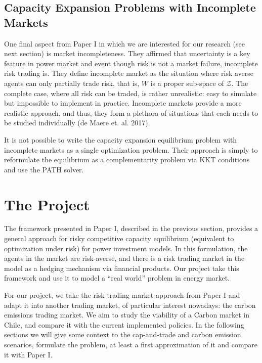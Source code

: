 \documentclass[11pt, letterpaper]{article}
\begin{document}
\subsection{Capacity Expansion Problems with Incomplete Markets}
One final aspect from Paper I in which we are interested for our research (see next section) is market incompleteness. They affirmed that uncertainty is a key feature in power market and event though risk is not a market failure, incomplete risk trading is. They define incomplete market as the situation where risk averse agents can only partially trade risk, that is, $W$ is a proper sub-space of $\mathcal{Z}$. The complete case, where all risk can be traded, is rather unrealistic: easy to simulate but impossible to implement in practice. Incomplete markets provide a more realistic approach, and thus, they form a plethora of situations that each needs to be studied individually (de Maere et. al. 2017). 

\smallskip

It is not possible to write the capacity expansion equilibrium problem with incomplete markets as a single optimization problem. Their approach is simply to reformulate the equilibrium as a complementarity problem via KKT conditions and use the PATH solver. 


\section{The Project} \label{future}

The framework presented in Paper I, described in the previous section, provides a general approach for risky competitive capacity equilibrium (equivalent to optimization under risk) for power investment models. In this formulation, the agents in the market are risk-averse, and there is a risk trading market in the model as a hedging mechanism via financial products.  Our project take this framework and use it to model a ``real world'' problem in energy market. 
\smallskip

For our project, we take the risk trading market approach from Paper I and adapt it into another trading market, of particular interest nowadays: the carbon emissions trading market. We aim to study the viability of a Carbon market in Chile, and compare it with the current implemented policies. 
In the following sections we will give some context to the cap-and-trade and carbon emission scenarios, formulate the problem, at least a first approximation of it and compare it with Paper I.
\end{document}
